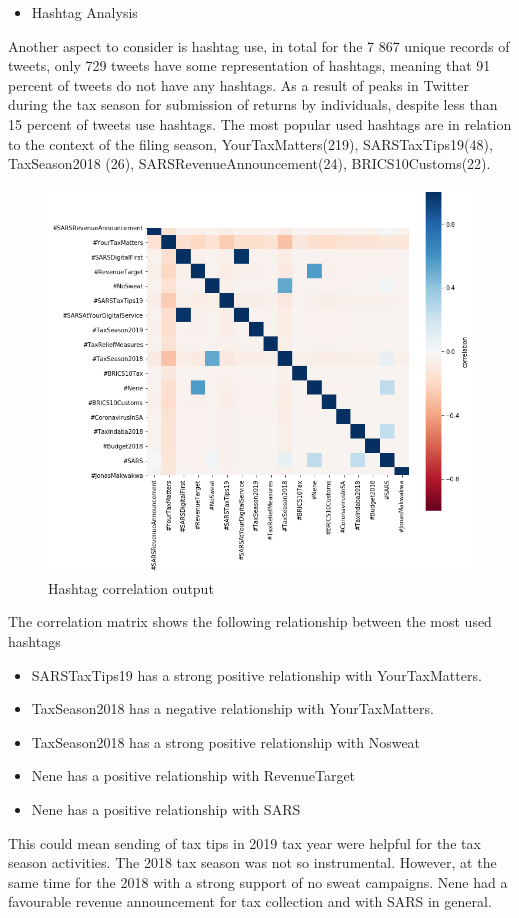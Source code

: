 \begin{itemize}
    \item Hashtag Analysis
\end{itemize}

Another aspect to consider is hashtag use, in total for the 7 867 unique records of tweets, only 729 tweets have some representation of hashtags, meaning that 91 percent of tweets do not have any hashtags.  As a result of peaks in Twitter during the tax season for submission of returns by individuals, despite less than 15 percent of tweets use hashtags. The most popular used hashtags are in relation to the context of the filing season, YourTaxMatters(219), SARSTaxTips19(48), TaxSeason2018 (26), SARSRevenueAnnouncement(24), BRICS10Customs(22).\\

\begin{figure}
    \centering
    \includegraphics[width=0.1\linewidth]{User Hashtag Correlation.png}
    \caption{Hashtag correlation output}
    \label{fig:Hashtag correlation for government user}
\end{figure}

The correlation matrix shows the following relationship between the most used hashtags
\begin{itemize}
    \item SARSTaxTips19 has a strong positive relationship with YourTaxMatters.  
    \item TaxSeason2018 has a negative relationship with YourTaxMatters.  
    \item TaxSeason2018 has a strong positive relationship with Nosweat
    \item  Nene has a positive relationship with RevenueTarget
    \item  Nene has a positive relationship with SARS 
\end{itemize}

This could mean sending of tax tips in 2019 tax year were helpful for the tax season activities.  The 2018 tax season was not so instrumental.  However, at the same time for the 2018 with a strong support of no sweat campaigns.  Nene had a favourable revenue announcement for tax collection and with SARS in general.

